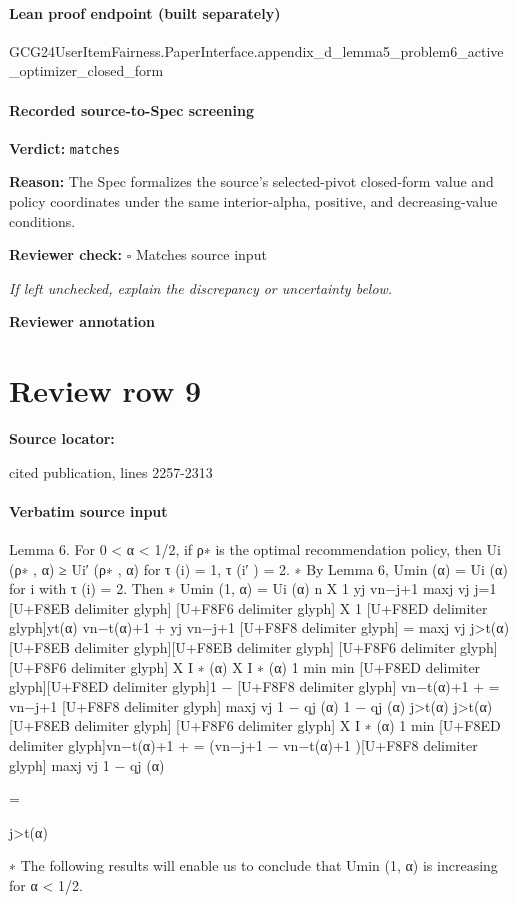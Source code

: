 \documentclass[10pt]{article}
\newcommand{\reviewerbox}{%
  \par\noindent\fbox{\parbox{0.96\linewidth}{\rule{0pt}{0.38in}}}\par
}
\newcommand{\reviewmatch}[1]{%
  \par\noindent\textbf{Reviewer check:} $\square$\; #1\par
  \noindent\emph{If left unchecked, explain the discrepancy or uncertainty below.}\par
}
\begin{document}
\paragraph{Lean proof endpoint (built separately)}\begin{ReviewVerbatim}
GCG24UserItemFairness.PaperInterface.appendix_d_lemma5_problem6_active_optimizer_closed_form
\end{ReviewVerbatim}

\paragraph{Recorded source-to-Spec screening}
\textbf{Verdict:} \texttt{matches}
\\
{\raggedright
\textbf{Reason:} The Spec formalizes the source's selected-\allowbreak{}pivot closed-\allowbreak{}form value and policy coordinates under the same interior-\allowbreak{}alpha, positive, and decreasing-\allowbreak{}value conditions.\allowbreak{}
\par}
\reviewmatch{Matches source input}
\noindent\textbf{Reviewer annotation}\par
\reviewerbox
\clearpage
\hypertarget{source-claim-d98bc9bd5bb82720}{}
\section*{Review row 9}
\textbf{Source locator:} {\footnotesize\raggedright cited publication, lines 2257-\allowbreak{}2313\par}
\paragraph{Verbatim source input}
\begin{ReviewVerbatim}
Lemma 6. For 0 < α < 1/2, if ρ∗ is the optimal recommendation policy, then Ui (ρ∗ , α) ≥
Ui′ (ρ∗ , α) for τ (i) = 1, τ (i′ ) = 2.
∗
By Lemma 6, Umin
(α) = Ui (α) for i with τ (i) = 2. Then
∗
Umin
(1, α) = Ui (α)
n
X
1
yj vn−j+1
maxj vj j=1
[U+F8EB delimiter glyph]
[U+F8F6 delimiter glyph]
X
1
[U+F8ED delimiter glyph]yt(α) vn−t(α)+1 +
yj vn−j+1 [U+F8F8 delimiter glyph]
=
maxj vj
j>t(α)
[U+F8EB delimiter glyph][U+F8EB delimiter glyph]
[U+F8F6 delimiter glyph]
[U+F8F6 delimiter glyph]
X I ∗ (α)
X I ∗ (α)
1
min
min
[U+F8ED delimiter glyph][U+F8ED delimiter glyph]1 −
[U+F8F8 delimiter glyph] vn−t(α)+1 +
=
vn−j+1 [U+F8F8 delimiter glyph]
maxj vj
1 − qj (α)
1 − qj (α)
j>t(α)
j>t(α)
[U+F8EB delimiter glyph]
[U+F8F6 delimiter glyph]
X I ∗ (α)
1
min
[U+F8ED delimiter glyph]vn−t(α)+1 +
=
(vn−j+1 − vn−t(α)+1 )[U+F8F8 delimiter glyph]
maxj vj
1 − qj (α)

=

j>t(α)

∗
The following results will enable us to conclude that Umin
(1, α) is increasing for α < 1/2.
\end{ReviewVerbatim}
\end{document}
